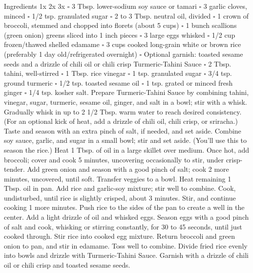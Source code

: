 Ingredients 1x 2x 3x {\tiny$\square$} 3 Tbsp. lower-sodium soy sauce or tamari {\tiny$\square$} 3 garlic cloves, minced {\tiny$\square$} 1/2 tsp. granulated sugar {\tiny$\square$} 2 to 3 Tbsp. neutral oil, divided {\tiny$\square$} 1 crown of broccoli, stemmed and chopped into florets (about 5 cups) {\tiny$\square$} 1 bunch scallions (green onion) greens sliced into 1 inch pieces {\tiny$\square$} 3 large eggs whisked {\tiny$\square$} 1/2 cup frozen/thawed shelled edamame {\tiny$\square$} 3 cups cooked long-grain white or brown rice (preferably 1 day old/refrigerated overnight) {\tiny$\square$} Optional garnish: toasted sesame seeds and a drizzle of chili oil or chili crisp Turmeric-Tahini Sauce {\tiny$\square$} 2 Tbsp. tahini, well-stirred {\tiny$\square$} 1 Tbsp. rice vinegar {\tiny$\square$} 1 tsp. granulated sugar {\tiny$\square$} 3/4 tsp. ground turmeric {\tiny$\square$} 1/2 tsp. toasted sesame oil {\tiny$\square$} 1 tsp. grated or minced fresh ginger {\tiny$\square$} 1/4 tsp. kosher salt. Prepare Turmeric-Tahini Sauce by combining tahini, vinegar, sugar, turmeric, sesame oil, ginger, and salt in a bowl; stir with a whisk. Gradually whisk in up to 2 1/2 Tbsp. warm water to reach desired consistency. (For an optional kick of heat, add a drizzle of chili oil, chili crisp, or sriracha.) Taste and season with an extra pinch of salt, if needed, and set aside. Combine soy sauce, garlic, and sugar in a small bowl; stir and set aside. (You'll use this to season the rice.) Heat 1 Tbsp. of oil in a large skillet over medium. Once hot, add broccoli; cover and cook 5 minutes, uncovering occasionally to stir, under crisp-tender. Add green onion and season with a good pinch of salt; cook 2 more minutes, uncovered, until soft. Transfer veggies to a bowl. Heat remaining 1 Tbsp. oil in pan. Add rice and garlic-soy mixture; stir well to combine. Cook, undisturbed, until rice is slightly crisped, about 3 minutes. Stir, and continue cooking 1 more minutes. Push rice to the sides of the pan to create a well in the center. Add a light drizzle of oil and whisked eggs. Season eggs with a good pinch of salt and cook, whisking or stirring constantly, for 30 to 45 seconds, until just cooked through. Stir rice into cooked egg mixture. Return broccoli and green onion to pan, and stir in edamame. Toss well to combine. Divide fried rice evenly into bowls and drizzle with Turmeric-Tahini Sauce. Garnish with a drizzle of chili oil or chili crisp and toasted sesame seeds.
\par

